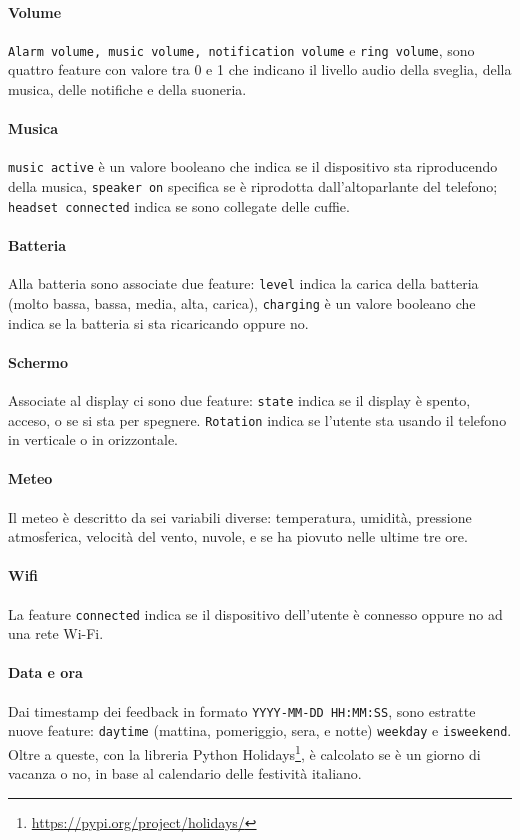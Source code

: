 \documentclass[12pt,italian]{report}
\begin{document}
\paragraph{Volume} \texttt{Alarm volume, music volume, notification volume} e \texttt{ring volume}, sono quattro feature con valore tra 0 e 1 che indicano il livello audio della sveglia, della musica, delle notifiche e della suoneria.

\paragraph{Musica} \texttt{music active} è un valore booleano che indica se il dispositivo sta riproducendo della musica, \texttt{speaker on} specifica se è riprodotta dall'altoparlante del telefono; \texttt{headset connected} indica se sono collegate delle cuffie.

\paragraph{Batteria} Alla batteria sono associate due feature: \texttt{level} indica la carica della batteria (molto bassa, bassa, media, alta, carica), \texttt{charging} è un valore booleano che indica se la batteria si sta ricaricando oppure no.

\paragraph{Schermo} Associate al display ci sono due feature: \texttt{state} indica se il display è spento, acceso, o se si sta per spegnere. \texttt{Rotation} indica se l'utente sta usando il telefono in verticale o in orizzontale.

\paragraph{Meteo} Il meteo è descritto da sei variabili diverse: temperatura, umidità, pressione atmosferica, velocità del vento, nuvole, e se ha piovuto nelle ultime tre ore.

\paragraph{Wifi} La feature \texttt{connected} indica se il dispositivo dell'utente è connesso oppure no ad una rete Wi-Fi.

\paragraph{Data e ora} Dai timestamp dei feedback in formato \texttt{YYYY-MM-DD HH:MM:SS}, sono estratte nuove feature: \texttt{daytime} (mattina, pomeriggio, sera, e notte) \texttt{weekday} e \texttt{isweekend}. Oltre a queste, con la libreria Python Holidays\footnote{\url{https://pypi.org/project/holidays/}}, è calcolato se è un giorno di vacanza o no, in base al calendario delle festività italiano.
\end{document}
